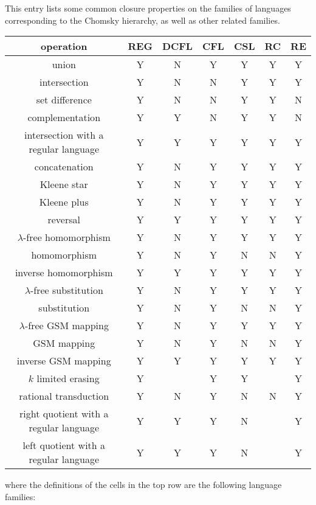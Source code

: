\documentclass[12pt]{article}
\begin{document}
This entry lists some common closure properties on the families of languages corresponding to the Chomsky hierarchy, as well as other related families.

\begin{center}
\begin{tabular}{|c|c|c|c|c|c|c|}
\hline\hline
operation & REG & DCFL & CFL & CSL & RC & RE \\
\hline\hline
union & Y & N & Y & Y & Y & Y \\
\hline
intersection & Y & N & N & Y & Y & Y \\
\hline
set difference & Y & N & N & Y & Y & N \\
\hline
complementation & Y & Y & N & Y & Y & N \\
\hline
intersection with a regular language & Y & Y & Y & Y & Y & Y \\
\hline
concatenation & Y & N & Y & Y & Y & Y \\
\hline
Kleene star & Y & N & Y & Y & Y & Y \\
\hline
Kleene plus & Y & N & Y & Y & Y & Y \\
\hline
reversal & Y & Y & Y & Y & Y & Y \\
\hline
$\lambda$-free homomorphism & Y & N & Y & Y & Y & Y \\
\hline
homomorphism & Y & N & Y & N & N & Y \\
\hline
inverse homomorphism & Y & Y & Y & Y & Y & Y \\
\hline
$\lambda$-free substitution & Y & N & Y & Y & Y & Y \\
\hline
substitution & Y & N & Y & N & N & Y \\
\hline
$\lambda$-free GSM mapping & Y & N & Y & Y & Y & Y \\
\hline
GSM mapping & Y & N & Y & N & N & Y \\
\hline
inverse GSM mapping & Y & Y & Y & Y & Y & Y \\
\hline
$k$ limited erasing & Y & & Y & Y & & Y \\
\hline
rational transduction & Y & N & Y & N & N & Y \\
\hline
right quotient with a regular language & Y & Y & Y & N & & Y \\
\hline
left quotient with a regular language & Y & Y & Y & N & & Y \\
\hline
\end{tabular}
\end{center}
where the definitions of the cells in the top row are the following language families:
\end{document}
